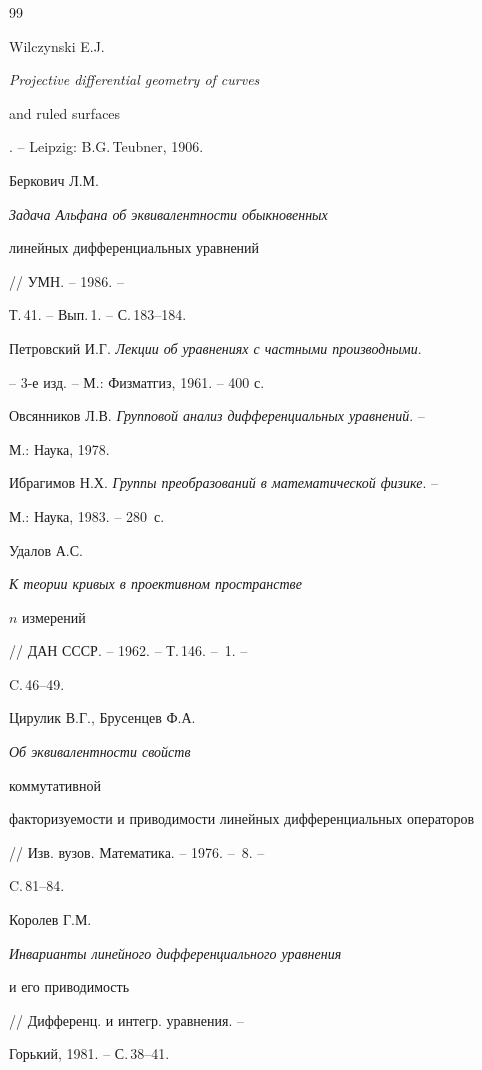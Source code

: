 \begin{thebibliography}{99} 


 




Wilczynski E.J. {\em Projective differential geometry of curves 


and ruled surfaces}. -- Leipzig: B.G.\,Teubner, 1906.




Беркович Л.М. {\em Задача Альфана об эквивалентности обыкновенных 


линейных дифференциальных уравнений} // УМН. -- 1986. -- 


Т.\,41. -- Вып.\,1. -- С.\,183--184. 




Петровский И.Г. {\em Лекции об уравнениях с частными производными}. 


-- 3-е изд. -- М.: Физматгиз, 1961. -- 400 с. 




Овсянников Л.В. {\em Групповой анализ дифференциальных уравнений}. -- 


М.: Наука, 1978.




Ибрагимов Н.Х. {\em Группы преобразований в математической физике}. -- 


М.: Наука, 1983. -- 280~с. 




Удалов А.С. {\em К теории кривых в проективном пространстве 


$n$ измерений} // ДАН СССР. -- 1962. -- Т.\,146. -- \No\,1. -- 


C.\,46--49.  




Цирулик В.Г., Брусенцев Ф.А. {\em Об эквивалентности свойств 


коммутативной 


факторизуемости и приводимости линейных дифференциальных операторов} 


// Изв. вузов. Математика. -- 1976. -- \No\,8. -- 


C.\,81--84. 




Королев Г.М. {\em Инварианты линейного дифференциального уравнения 


и его приводимость} // Дифференц. и интегр. уравнения. -- 


Горький, 1981. -- С.\,38--41. 



\end{thebibliography}
